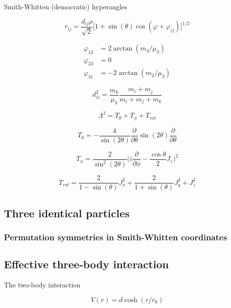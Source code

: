 \documentclass{article}
\begin{document}
Smith-Whitten (democratic) hyperangles

\begin{equation}
r_{ij} = \frac{d_{ij} \rho}{\sqrt{2}} \Big[1+\sin(\theta) \cos{(\varphi + \varphi_{ij})}\Big]^{1/2}
\end{equation}

\begin{align*}
\varphi_{12} &= 2 \arctan{(m_{3} / \mu_{3})} \\
\varphi_{23} &= 0 \\
\varphi_{31} &= -2 \arctan{(m_{2} / \mu_{3})}
\end{align*}

\begin{equation}
d_{ij}^{2} =  \frac{m_{k}}{\mu_{3}} \frac{m_{i} + m_{j}}{m_{i} + m_{j} + m_{k}}
\end{equation}

\begin{equation}
\Lambda^2 = T_{\theta} + T_{\phi} + T_{rot}  
\end{equation}

\begin{equation}
T_{\theta} = -\frac{4}{\sin(2\theta)} \frac{\partial}{\partial \theta} \sin(2\theta) \frac{\partial}{\partial \theta}
\end{equation}

\begin{equation}
T_{\phi} = \frac{2}{\sin^2{(2 \theta)}} \Big( i \frac{\partial}{\partial \phi} - \frac{\cos{\theta}}{2} J_{z}\Big)^2  
\end{equation}

\begin{equation}
T_{rot} = \frac{2}{1-\sin(\theta)} J_{x}^{2} + \frac{2}{1+\sin(\theta)} J_{y}^{2} + J_{z}^{2}  
\end{equation}

\subsection{Three identical particles}
\subsubsection{Permutation symmetries in Smith-Whitten coordinates}

\subsection{Effective three-body interaction}
The two-body interaction 

\begin{equation}
V(r) = d\cosh{(r/r_0)}
\end{equation}
\end{document}
